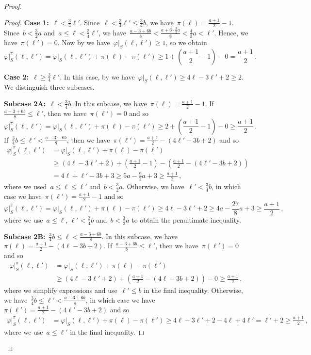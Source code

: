 \documentclass[10pt,a4paper]{amsart}
\newenvironment{claimproof}[1][Proof]{
	\renewcommand{\oldqed}{\qedsymbol}
	\renewcommand{\qedsymbol}{\endofClaim}
	\begin{proof}[#1]
	}{
	\end{proof}
	\renewcommand{\qedsymbol}{\oldqed}
}
\newcommand{\f}{\varphi}
\newcommand{\w}{\f\vert_S}
\begin{document}
\begin{proof}
\begin{claimproof}
			\textbf{Case 1:}~$\ell<\frac{3}{4}\ell'$. Since~$\ell<\frac{3}{4}\ell'\le\frac{3}{4}b$, we have~$\pi(\ell)=\frac{a+1}{2}-1$. Since~$b<\frac{3}{2}a$ and~$a\le\ell<\frac{3}{4}\ell'$, we have~$\frac{a-3+6b}{8} <\frac{a+6\cdot\frac{3}{2}a}{8}<\frac{4}{3}a<\ell'$. Hence, we have~$\pi(\ell')=0$. Now by  we have~$\w(\ell,\ell')\ge1$, so we obtain
			\[ \w^\pi(\ell,\ell') = \w(\ell,\ell') + \pi(\ell) - \pi(\ell') \ge 1 + \left(\frac{a+1}{2} - 1\right) - 0 =\frac{a+1}{2}\,. \]
			
			\textbf{Case 2:}~$\ell\ge\frac{3}{4}\ell'$. In this case, by  we have~$\w(\ell,\ell')\ge 4\ell-3\ell'+2\ge 2$. We distinguish three subcases.
			
			\textbf{Subcase 2A:}~$\ell<\frac{3}{4}b$. In this subcase, we have~$\pi(\ell)=\frac{a+1}{2}-1$. If~$\frac{a-3+6b}{8}\le\ell'$, then we have~$\pi(\ell')=0$ and so
			\[ \w^\pi(\ell,\ell')=\w(\ell,\ell')+\pi(\ell)-\pi(\ell')\ge 2+\left(\frac{a+1}{2}-1\right)-0\ge\frac{a+1}{2}\,. \]
			If~$\frac{3}{4}b\le\ell'<\frac{a-3+6b}{8}$, then we have~$\pi(\ell')=\frac{a+1}{2}-(4\ell'-3b+2)$ and so
			\begin{align*}
				\w^\pi(\ell,\ell') &= \w(\ell,\ell')+\pi(\ell)-\pi(\ell') \\
				&\ge (4\ell-3\ell'+2)+\left(\frac{a+1}{2}-1\right)-\left(\frac{a+1}{2}-(4\ell'-3b+2)\right)\\
				&=4\ell+\ell'-3b+3\ge5a-\frac{9}{2}a+3\ge\frac{a+1}{2}\,,
			\end{align*}
			where we used~$a\le\ell\le\ell'$ and~$b<\frac{3}{2}a$. Otherwise, we have~$\ell'<\frac{3}{4}b$, in which case we have~$\pi(\ell')=\frac{a+1}{2}-1$ and so
			\[ \w^\pi(\ell,\ell') = \w(\ell,\ell')+\pi(\ell)-\pi(\ell') \ge 4\ell-3\ell'+2 \ge 4a-\frac{27}{8}a +3 \ge\frac{a+1}{2}\,,\]
			where we use~$a\le\ell$, $\ell'<\frac{3}{4}b$ and~$b<\frac{3}{2}a$ to obtain the penultimate inequality.
			
			\textbf{Subcase 2B:}~$\frac{3}{4}b\le\ell<\frac{a-3+6b}{8}$. In this subcase, we have~$\pi(\ell)=\frac{a+1}{2}-(4\ell-3b+2)$. If~$\frac{a-3+6b}{8}\le\ell'$, then we have~$\pi(\ell')=0$ and so
			\begin{align*}
				\w^\pi(\ell,\ell') &= \w(\ell,\ell')+\pi(\ell)-\pi(\ell') \\
				&\ge (4\ell-3\ell'+2)+\left(\frac{a+1}{2}-(4\ell-3b+2)\right)-0 \ge\frac{a+1}{2}\,,
			\end{align*}
			where we simplify expressions and use~$\ell'\le b$ in the final inequality. Otherwise, we have~$\frac{3}{4}b\le\ell'<\frac{a-3+6b}{8}$, in which case we have~$\pi(\ell')=\frac{a+1}{2}-(4\ell'-3b+2)$ and so
			\begin{align*} 
				\w^\pi(\ell,\ell')&= \w(\ell,\ell')+\pi(\ell)-\pi(\ell') \ge 4\ell-3\ell'+2-4\ell+4\ell'=\ell'+2 \ge \frac{a+1}{2}\,, 
			\end{align*}
			where we use~$a\le\ell'$ in the final inequality.
			

\end{claimproof}
\end{proof}
\end{document}
